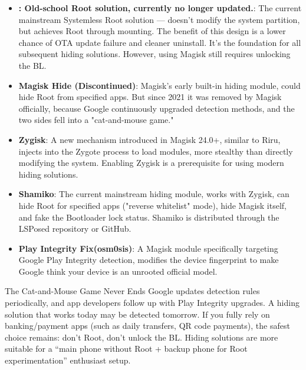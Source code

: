\begin{itemize}
  \item \textbf{: Old-school Root solution, currently no longer updated.}: The current mainstream Systemless Root solution — doesn't modify the system partition, but achieves Root through mounting. The benefit of this design is a lower chance of OTA update failure and cleaner uninstall. It's the foundation for all subsequent hiding solutions. However, using Magisk still requires unlocking the BL.
  \item \textbf{Magisk Hide (Discontinued)}: Magisk's early built-in hiding module, could hide Root from specified apps. But since 2021 it was removed by Magisk officially, because Google continuously upgraded detection methods, and the two sides fell into a "cat-and-mouse game."
  \item \textbf{Zygisk}: A new mechanism introduced in Magisk 24.0+, similar to Riru, injects into the Zygote process to load modules, more stealthy than directly modifying the system. Enabling Zygisk is a prerequisite for using modern hiding solutions.
  \item \textbf{Shamiko}: The current mainstream hiding module, works with Zygisk, can hide Root for specified apps ("reverse whitelist" mode), hide Magisk itself, and fake the Bootloader lock status. Shamiko is distributed through the LSPosed repository or GitHub.
  \item \textbf{Play Integrity Fix(osm0sis)}: A Magisk module specifically targeting Google Play Integrity detection, modifies the device fingerprint to make Google think your device is an unrooted official model.
\end{itemize}

\begin{tcbwarn}{The Cat-and-Mouse Game Never Ends}
Google updates detection rules periodically, and app developers follow up with Play Integrity upgrades. A hiding solution that works today may be detected tomorrow. If you fully rely on banking/payment apps (such as daily transfers, QR code payments), the safest choice remains: don't Root, don't unlock the BL. Hiding solutions are more suitable for a “main phone without Root + backup phone for Root experimentation” enthusiast setup.

\end{tcbwarn}


